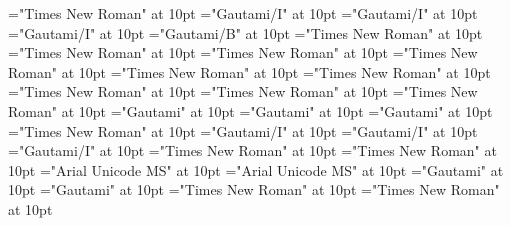 \documentclass[c5paper,twoside]{article}
\begin{document}
\font\translationsexamplessensesensesentryletDatadicBody="Times New Roman" at 10pt
\font\spanenexampleggoTeluINexamplessensesensesentryletDatadicBody="Gautami/I" at 10pt
\font\spanggoTeluINexampleggoTeluINexamplessensesensesentryletDatadicBody="Gautami/I" at 10pt
\font\exampleggoTeluINexamplessensesensesentryletDatadicBody="Gautami/I" at 10pt
\font\LexEntrypublishStemComponentTargetHeadWordRefggoTeluINaentryrefcomponentprimaryrefsentryletDatadicBody="Gautami/B" at 10pt
\font\aentryrefcomponentprimaryrefsentryletDatadicBody="Times New Roman" at 10pt
\font\entryrefcomponentprimaryrefsentryletDatadicBody="Times New Roman" at 10pt
\font\spanenentryreftypeprimaryrefsentryletDatadicBody="Times New Roman" at 10pt
\font\spanenLexEntryTypepublishStemEntryTypeAbbreviationPubenentryreftypeprimaryrefsentryletDatadicBody="Times New Roman" at 10pt
\font\LexEntryTypepublishStemEntryTypeAbbreviationPubenentryreftypeprimaryrefsentryletDatadicBody="Times New Roman" at 10pt
\font\entryreftypeprimaryrefsentryletDatadicBody="Times New Roman" at 10pt
\font\spanenprimaryrefsentryletDatadicBody="Times New Roman" at 10pt
\font\primaryrefsentryletDatadicBody="Times New Roman" at 10pt
\font\spanenexamplessensesensesentryletDatadicBody="Times New Roman" at 10pt
\font\spanentranslationLdtetranslationsxitemexamplessensesensesentryletDatadicBody="Gautami" at 10pt
\font\spantetranslationLdtetranslationsxitemexamplessensesensesentryletDatadicBody="Gautami" at 10pt
\font\translationLdtetranslationsxitemexamplessensesensesentryletDatadicBody="Gautami" at 10pt
\font\translationsxitemexamplessensesensesentryletDatadicBody="Times New Roman" at 10pt
\font\spanenexampleggoTeluINxitemexamplessensesensesentryletDatadicBody="Gautami/I" at 10pt
\font\spanggoTeluINexampleggoTeluINxitemexamplessensesensesentryletDatadicBody="Gautami/I" at 10pt
\font\exampleggoTeluINxitemexamplessensesensesentryletDatadicBody="Gautami/I" at 10pt
\font\xitemexamplessensesensesentryletDatadicBody="Times New Roman" at 10pt
\font\examplessensesensesentryletDatadicBody="Times New Roman" at 10pt
\font\spanhixitemhiLexSensepublishStemGlossPubLdtesensesensesentryletDatadicBody="Arial Unicode MS" at 10pt
\font\xitemhiLexSensepublishStemGlossPubLdtesensesensesentryletDatadicBody="Arial Unicode MS" at 10pt
\font\spantexitemteLexSensepublishStemGlossPubLdtesensesensesentryletDatadicBody="Gautami" at 10pt
\font\xitemteLexSensepublishStemGlossPubLdtesensesensesentryletDatadicBody="Gautami" at 10pt
\font\xsensenumberaftersensesensesentryletDatadicBody="Times New Roman" at 10pt
\font\xsensenumbersensesensesentryletDatadicBody="Times New Roman" at 10pt
\end{document}
